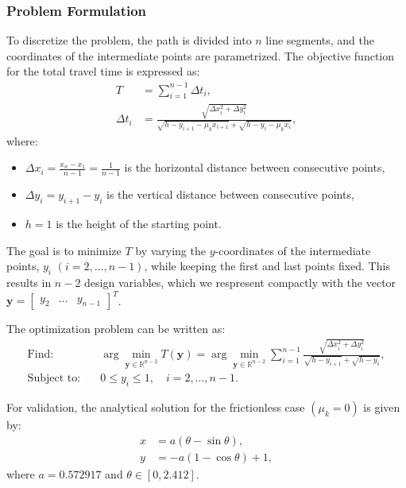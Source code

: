 \documentclass[12pt]{article}
\begin{document}
\subsubsection{Problem Formulation}
To discretize the problem, the path is divided into $n$ line segments, and the coordinates of the intermediate points are parametrized. The objective function for the total travel time is expressed as:
\begin{align*}
    T &= \sum_{i=1}^{n-1} \Delta t_i, \\
    \Delta t_i &= \frac{\sqrt{\Delta x_i^2 + \Delta y_i^2}}{\sqrt{h - y_{i+1} - \mu_k x_{i+1}} + \sqrt{h - y_i - \mu_k x_i}},
\end{align*}
where:
\begin{itemize}
    \item $\Delta x_i = \frac{x_n - x_1}{n-1} = \frac{1}{n-1}$ is the horizontal distance between consecutive points,
    \item $\Delta y_i = y_{i+1} - y_i$ is the vertical distance between consecutive points,
    \item $h = 1$ is the height of the starting point.
\end{itemize}

The goal is to minimize $T$ by varying the $y$-coordinates of the intermediate points, $y_i$ $(i = 2, \ldots, n-1)$, while keeping the first and last points fixed. This results in $n-2$ design variables, which we respresent compactly with the vector $\mathbf{y} = \begin{bmatrix}y_2 & \ldots & y_{n-1}\end{bmatrix}^T$.

The optimization problem can be written as:
\begin{align*}
    \text{Find:} & \quad \arg \min_{\mathbf{y} \in \mathbb{R}^{n-2}} T(\mathbf{y}) = \arg \min_{\mathbf{y} \in \mathbb{R}^{n-2}} \sum_{i=1}^{n-1} \frac{\sqrt{\Delta x_i^2 + \Delta y_i^2}}{\sqrt{h - y_{i+1}} + \sqrt{h - y_i}}, \\
    \text{Subject to:} & \quad 0 \leq y_i \leq 1, \quad i = 2, \ldots, n-1.
\end{align*}

For validation, the analytical solution for the frictionless case $(\mu_k = 0)$ is given by:
\begin{align*}
    x &= a(\theta - \sin\theta), \\
    y &= -a(1 - \cos\theta) + 1,
\end{align*}
where $a = 0.572917$ and $\theta \in [0, 2.412]$.
\end{document}
